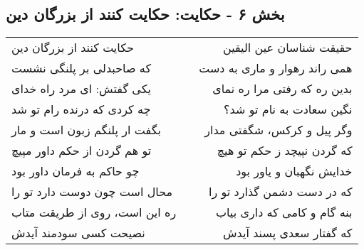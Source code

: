 \begin{center}
\section*{بخش ۶ - حکایت: حکایت کنند از بزرگان دین}
\label{sec:006}
\begin{longtable}{l p{0.5cm} r}
حکایت کنند از بزرگان دین
&&
حقیقت شناسان عین الیقین
\\
که صاحبدلی بر پلنگی نشست
&&
همی راند رهوار و ماری به دست
\\
یکی گفتش: ای مرد راه خدای
&&
بدین ره که رفتی مرا ره نمای
\\
چه کردی که درنده رام تو شد
&&
نگین سعادت به نام تو شد؟
\\
بگفت ار پلنگم زبون است و مار
&&
وگر پیل و کرکس، شگفتی مدار
\\
تو هم گردن از حکم داور مپیچ
&&
که گردن نپیچد ز حکم تو هیچ
\\
چو حاکم به فرمان داور بود
&&
خدایش نگهبان و یاور بود
\\
محال است چون دوست دارد تو را
&&
که در دست دشمن گذارد تو را
\\
ره این است، روی از طریقت متاب
&&
بنه گام و کامی که داری بیاب
\\
نصیحت کسی سودمند آیدش
&&
که گفتار سعدی پسند آیدش
\\
\end{longtable}
\end{center}
